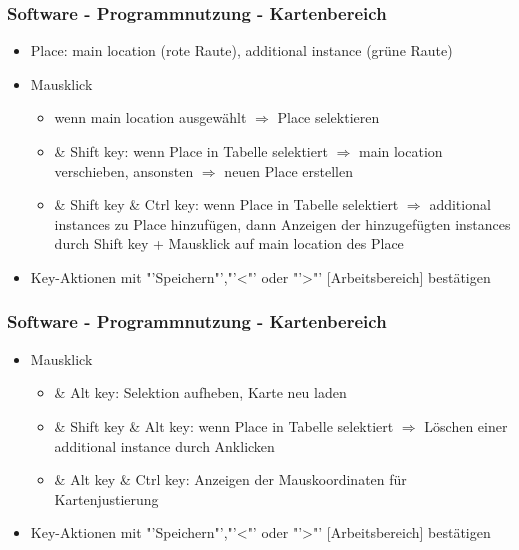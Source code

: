 \documentclass{beamer}
\begin{document}
	\begin{frame}
			\frametitle{Software - Programmnutzung - Kartenbereich} 
				\begin{itemize}
				\item Place: main location (rote Raute), additional instance (grüne Raute)
				\item Mausklick
				\begin{itemize}
						\item wenn main location ausgewählt $\Rightarrow$ Place selektieren
						\item \& Shift key: wenn Place in Tabelle selektiert $\Rightarrow$ main location verschieben, ansonsten $\Rightarrow$ neuen Place erstellen
						\item \& Shift key \& Ctrl key: wenn Place in Tabelle selektiert $\Rightarrow$ additional instances zu Place hinzufügen, dann Anzeigen der hinzugefügten instances durch Shift key + Mausklick auf main location des Place
\end{itemize}								
				\item Key-Aktionen mit "'Speichern"',"'\textless"' oder "'\textgreater"' [Arbeitsbereich] bestätigen
				\end{itemize}
	\end{frame}
	
	\begin{frame}
			\frametitle{Software - Programmnutzung - Kartenbereich} 
				\begin{itemize}	
					\item Mausklick
					\begin{itemize}
							\item \& Alt key: Selektion aufheben, Karte neu laden
							\item \& Shift key \& Alt key: wenn Place in Tabelle selektiert $\Rightarrow$ Löschen einer additional instance durch Anklicken 
 							\item \& Alt key \& Ctrl key: Anzeigen der Mauskoordinaten für Kartenjustierung
					\end{itemize}
					\item Key-Aktionen mit "'Speichern"',"'\textless"' oder "'\textgreater"' [Arbeitsbereich] bestätigen
				\end{itemize}
	\end{frame}
	
\end{document}
